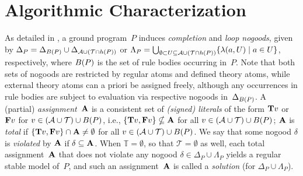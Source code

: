 
\section{Algorithmic Characterization}
\label{sec:algo}

As detailed in \cite{gekasc09c}, a ground program~$P$ induces
\emph{completion} and \emph{loop nogoods},
given by %
\(
  \Delta_P = \Delta_{B(P)} \cup
             \Delta_{\mathcal{A}\cup(\mathcal{T}\cap h(P))}
\)
or
\(
  \Lambda_P = \mbox{$\bigcup_{\emptyset\subset U\subseteq \mathcal{A}\cup(\mathcal{T}\cap h(P))}$}
              \{ \lambda(a,U) \mid a\in U \}
\),
respectively,
where $B(P)$ is the set of rule bodies occurring in~$P$.
Note that both sets of nogoods are restricted by regular atoms and defined theory atoms,
while external theory atoms can a priori be assigned freely,
although any occurrences in rule bodies are subject to evaluation
via respective nogoods in~$\Delta_{B(P)}$.
A (partial) \emph{assignment}~$\mathbf{A}$ is a consistent set
of \emph{(signed) literals} of the form $\mathbf{T} v$ or $\mathbf{F} v$ for
$v\in(\mathcal{A}\cup\mathcal{T})\cup B(P)$,
i.e., $\{\mathbf{T} v,\mathbf{F} v\}\nsubseteq\mathbf{A}$
for all $v\in(\mathcal{A}\cup\mathcal{T})\cup B(P)$;
$\mathbf{A}$ is \emph{total} if $\{\mathbf{T} v,\mathbf{F} v\}\cap\mathbf{A}\neq\emptyset$
for all $v\in(\mathcal{A}\cup\mathcal{T})\cup B(P)$.
We say that some nogood $\delta$ is \emph{violated} by $\mathbf{A}$ if $\delta\subseteq\mathbf{A}$.
%
When $\mathbb{T}=\emptyset$, so that $\mathcal{T}=\emptyset$ as well,
each total assignment~$\mathbf{A}$ that does not violate any nogood $\delta\in\Delta_P\cup\Lambda_P$
yields a regular stable model of~$P$, and such an assignment~$\mathbf{A}$ is called a \emph{solution}
(for $\Delta_P\cup\Lambda_P$).

